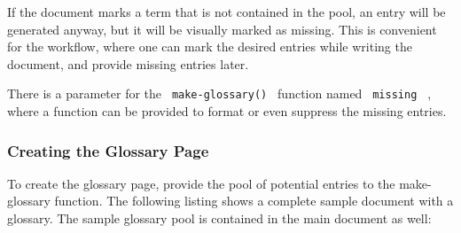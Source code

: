 If the document marks a term that is not contained in the pool, an entry
will be generated anyway, but it will be visually marked as missing.
This is convenient for the workflow, where one can mark the desired
entries while writing the document, and provide missing entries later.

There is a parameter for the \texttt{\ make-glossary()\ } function named
\texttt{\ missing\ } , where a function can be provided to format or
even suppress the missing entries.

\subsubsection{Creating the Glossary
Page}\label{creating-the-glossary-page}

To create the glossary page, provide the pool of potential entries to
the make-glossary function. The following listing shows a complete
sample document with a glossary. The sample glossary pool is contained
in the main document as well:

